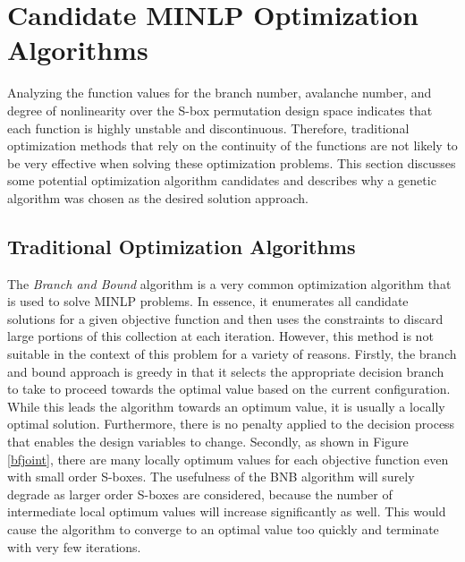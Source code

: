 \documentclass[11pt]{article}
\begin{document}
\section{Candidate MINLP Optimization Algorithms}

Analyzing the function values for the branch number, avalanche number, and degree of nonlinearity over the S-box permutation design space indicates that each function is highly unstable and discontinuous. Therefore, traditional optimization methods that rely on the continuity of the functions are not likely to be very effective when solving these optimization problems. This section discusses some potential optimization algorithm candidates and describes why a genetic algorithm was chosen as the desired solution approach.

\subsection{Traditional Optimization Algorithms}

The \emph{Branch and Bound} algorithm is a very common optimization algorithm that is used to solve MINLP problems. In essence, it enumerates all candidate solutions for a given objective function and then uses the constraints to discard large portions of this collection at each iteration. However, this method is not suitable in the context of this problem for a variety of reasons. Firstly, the branch and bound approach is greedy in that it selects the appropriate decision branch to take to proceed towards the optimal value based on the current configuration. While this leads the algorithm towards an optimum value, it is usually a locally optimal solution. Furthermore, there is no penalty applied to the decision process that enables the design variables to change. Secondly, as shown in Figure \ref{bfjoint}, there are many locally optimum values for each objective function even with small order S-boxes. The usefulness of the BNB algorithm will surely degrade as larger order S-boxes are considered, because the number of intermediate local optimum values will increase significantly as well. This would cause the algorithm to converge to an optimal value too quickly and terminate with very few iterations. 
\end{document}
